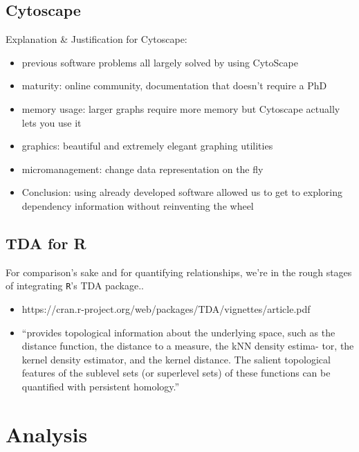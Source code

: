 \documentclass{beamer}
\theoremstyle{definition}
\theoremstyle{example}
\theoremstyle{conjecture}
\def\code#1{\texttt{#1}} %
\begin{document}
\subsection{Cytoscape}
\label{subsc.cytoscape}
\begin{frame}
Explanation \& Justification for Cytoscape:
\begin{itemize}
  \item previous software problems all largely solved by using CytoScape
  \item maturity: online community, documentation that doesn't require a PhD
  \item memory usage: larger graphs require more memory but Cytoscape actually lets you use it
  \item graphics: beautiful and extremely elegant graphing utilities
  \item micromanagement: change data representation on the fly
  \item Conclusion: 
  		using already developed software allowed us to get 
        to exploring dependency information without reinventing the wheel
\end{itemize}
\end{frame}

\subsection{TDA for R}
\label{subsc.r}
\begin{frame}
For comparison's sake and for quantifying relationships, 
we're in the rough stages of integrating \code{R}'s TDA package..
\begin{itemize}
  \item https://cran.r-project.org/web/packages/TDA/vignettes/article.pdf
  \item ``provides topological information about the underlying
space, such as the distance function, the distance to a measure, the kNN density estima-
tor, the kernel density estimator, and the kernel distance.  The salient topological features
of the sublevel sets (or superlevel sets) of these functions can be quantified with persistent
homology.''
\end{itemize}
\end{frame}

\section{Analysis}
\label{sc.analysis}
\end{document}
